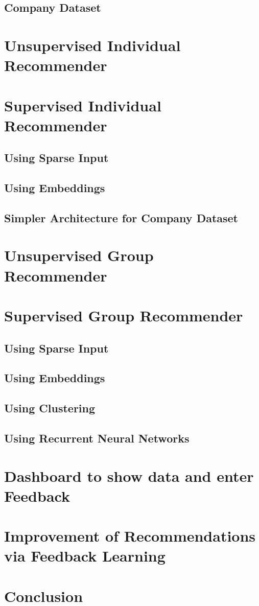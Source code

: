 \subsection{Company Dataset}\label{subsection:company-dataset}


\section{Unsupervised Individual Recommender}

\section{Supervised Individual Recommender}

\subsection{Using Sparse Input}

\subsection{Using Embeddings}

\subsection{Simpler Architecture for Company Dataset}

\section{Unsupervised Group Recommender}

\section{Supervised Group Recommender}

\subsection{Using Sparse Input}

\subsection{Using Embeddings}

\subsection{Using Clustering}

\subsection{Using Recurrent Neural Networks}

\section{Dashboard to show data and enter Feedback}

\section{Improvement of Recommendations via Feedback Learning}

\section{Conclusion}
